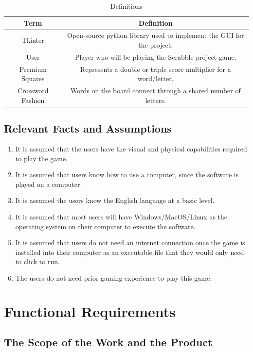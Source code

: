\documentclass[12pt, titlepage]{article}
\begin{document}
\begin{table}[!htb]
    \centering
    \caption{Definitions}
    \begin{tabular}{|c|c|}
        \hline
        Term & Definition \\
        \hline
        Tkinter & Open-source python library used to implement the GUI for the project. \\
        User & Player who will be playing the Scrabble project game. \\  
        Premium Squares & Represents a double or triple score multiplier for a word/letter. \\
        Crossword Fashion & Words on the board connect through a shared number of letters. \\
        \hline
    \end{tabular}
\end{table}

\subsection{Relevant Facts and Assumptions}
\begin{enumerate}
    \item It is assumed that the users have the visual and physical capabilities required to play the game.
    \item It is assumed that users know how to use a computer, since the software is played on a computer.
    \item It is assumed the users know the English language at a basic level.
    \item It is assumed that most users will have Windows/MacOS/Linux as the operating system on their computer to execute the software. 
    \item It is assumed that users do not need an internet connection once the game is installed into their computer as an executable file that they would only need to click to run.
    \item The users do not need prior gaming experience to play this game.
\end{enumerate}


\section{Functional Requirements}

\subsection{The Scope of the Work and the Product} 
\end{document}
